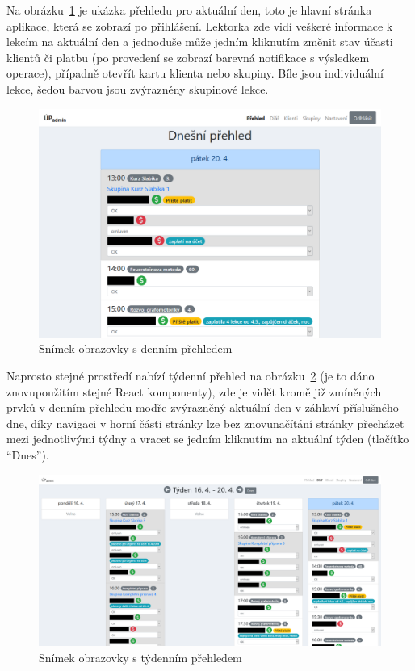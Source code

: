    Na obrázku~\ref{fig:screen-den} je ukázka přehledu pro aktuální den, toto je hlavní stránka aplikace, která se zobrazí po přihlášení. Lektorka zde vidí veškeré informace k lekcím na aktuální den a jednoduše může jedním kliknutím změnit stav účasti klientů či platbu (po provedení se zobrazí barevná notifikace s výsledkem operace), případně otevřít kartu klienta nebo skupiny. Bíle jsou individuální lekce, šedou barvou jsou zvýrazněny skupinové lekce.
    
        \begin{figure}[hb]\centering
        	\includegraphics[width=1\textwidth]{img/screen-den.png}
        	\caption{Snímek obrazovky s denním přehledem}\label{fig:screen-den}
        \end{figure}
    
    Naprosto stejné prostředí nabízí týdenní přehled na obrázku~\ref{fig:screen-tyden} (je to dáno znovupoužitím stejné React komponenty), zde je vidět kromě již zmíněných prvků v denním přehledu modře zvýrazněný aktuální den v záhlaví příslušného dne, díky navigaci v horní části stránky lze bez znovunačítání stránky přecházet mezi jednotlivými týdny a vracet se jedním kliknutím na aktuální týden (tlačítko \enquote{Dnes}).
        
        \begin{landscape}
            \begin{figure}\centering
            	\includegraphics[totalheight=0.8\textheight]{img/screen-tyden.png}
            	\caption{Snímek obrazovky s týdenním přehledem}\label{fig:screen-tyden}
            \end{figure}
        \end{landscape}
    

